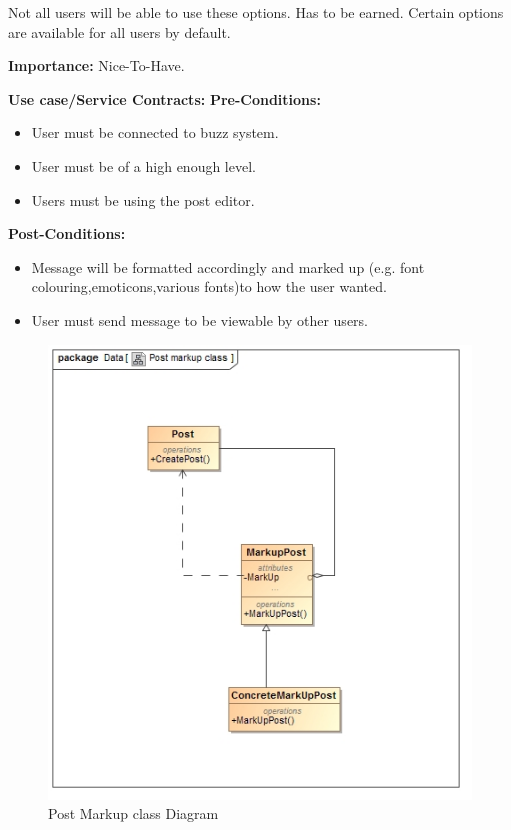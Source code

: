 \documentclass[11pt]{article}
\begin{document}
\begin{enumerate}
Not all users will be able to use these options. Has to be earned. Certain options are available for all users by default.

 
\textbf{Importance:} Nice-To-Have.

 
\textbf{Use case/Service Contracts:} 
\newline
\textbf{Pre-Conditions: }
\begin{itemize}
\item User must be connected to buzz system.
\item User must be of a high enough level.
\item Users must be using the post editor.
\end{itemize}
 

\textbf{Post-Conditions: }
\begin{itemize}

\item Message will be formatted accordingly and marked up (e.g. font colouring,emoticons,various fonts)to how the user wanted. 
\item User must send message to be viewable by other users.
\end{itemize}

\graphicspath{ {../Diagrams/Matt/Class/} }
	  \begin{figure}[H]	
    	\includegraphics[scale=0.5]{PostmarkupClass.jpg}
    	\caption{Post Markup class Diagram}
	\end{figure}


\end{enumerate}
\end{document}
